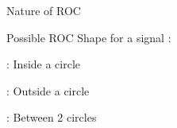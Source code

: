 \documentclass{beamer}
\begin{document}
\begin{frame}{Nature of ROC}
\begin{figure}[ht]
\begin{minipage}[r]{.32\linewidth}
         \end{minipage}
    \end{figure}
    
    Possible ROC Shape for a signal :
    \begin{description} [align=right, labelwidth = 1.75cm]
        \item [$r < r_1$] : Inside a circle
        \item [$r > r_2$] : Outside a circle
        \item [$r_1 < r < r_2$] : Between 2 circles 
    \end{description}
    
\end{frame}
\end{document}
